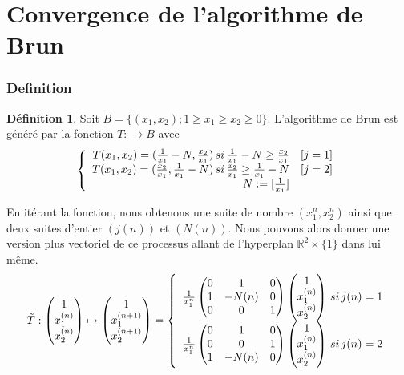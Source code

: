 \documentclass[12pt]{article}
\theoremstyle{plain}%
\theoremstyle{definition}
\newtheorem{dfnt}{Définition}[section]
\theoremstyle{remark}
\begin{document}
\part*{Convergence de l'algorithme de Brun}
\section{Definition}

\begin{dfnt}
Soit $B=\{(x_1,x_2); 1 \geq x_1 \geq x_2 \geq 0\}$. L'algorithme de Brun est généré par la fonction $T: \to B$ avec
\[
\left \{
\begin{array}{r c }
T(x_1,x_2)=(\frac{1}{x_1}-N,\frac{x_2}{x_1}) \, si \, \frac{1}{x_1}-N \geq \frac{x_2}{x_1} & [j=1] \\
T(x_1,x_2)=(\frac{x_2}{x_1},\frac{1}{x_1}-N) \, si \, \frac{x_2}{x_1} \geq  \frac{1}{x_1}-N & [j=2] \\
N:=[\frac{1}{x_1}]
\end{array}
\right .
\]
\end{dfnt}
En itérant la fonction, nous obtenons une suite de nombre $(x_1^n,x_2^n)$ ainsi que deux suites d'entier $(j(n))$ et $(N(n))$.
Nous pouvons alors donner une version plus vectoriel de ce processus allant de l'hyperplan $\mathbb{R}^2 \times \{1 \} $ dans lui même.
\[
\tilde{T}:\begin{pmatrix} 1 \\ x_1^{(n)} \\ x_2^{(n)} \end{pmatrix} \mapsto \begin{pmatrix} 1 \\ x_1^{(n+1)} \\ x_2^{(n+1)} \end{pmatrix} = \left \{
\begin{array}{r c}
\frac{1}{x_1^n}\begin{pmatrix} 0 & 1 & 0 \\1 & -N(n) & 0 \\0 & 0& 1 \end{pmatrix} \begin{pmatrix} 1 \\ x_1^{(n)} \\ x_2^{(n)} \end{pmatrix} \, si \, j(n)=1\\
\frac{1}{x_1^n}\begin{pmatrix} 0 & 1 & 0 \\0 & 0 & 1 \\1 & -N(n) & 0 \end{pmatrix} \begin{pmatrix} 1 \\ x_1^{(n)} \\ x_2^{(n)} \end{pmatrix}\, si \, j(n)=2\\
\end{array}
\right .
\]
\end{document}
